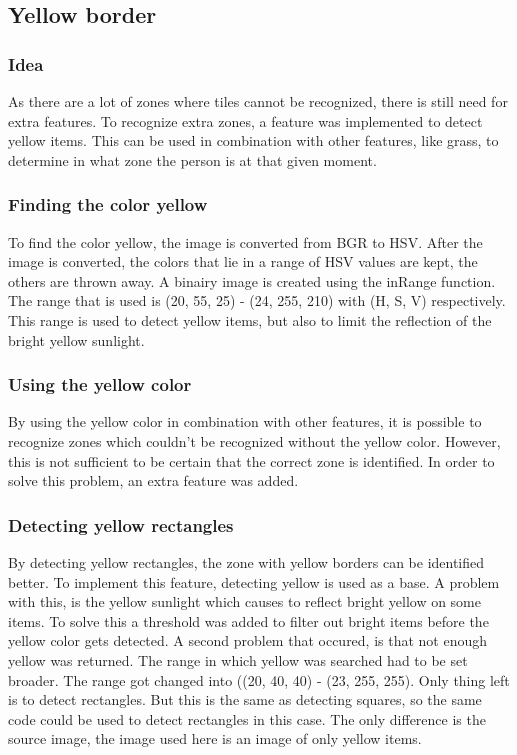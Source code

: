 \subsection{Yellow border}
\subsubsection{Idea}
As there are a lot of zones where tiles cannot be recognized, there is still need for extra features. To recognize extra zones, a feature was implemented to detect yellow items. This can be used in combination with other features, like grass, to determine in what zone the person is at that given moment. 

\subsubsection{Finding the color yellow}

To find the color yellow, the image is converted from BGR to HSV. After the image is converted, the colors that lie in a range of HSV values are kept, the others are thrown away. A binairy image is created using the inRange function. The range that is used is (20, 55, 25) - (24, 255, 210) with (H, S, V) respectively. This range is used to detect yellow items, but also to limit the reflection of the bright yellow sunlight. 

\subsubsection{Using the yellow color}
By using the yellow color in combination with other features, it is possible to recognize zones which couldn't be recognized without the yellow color. However, this is not sufficient to be certain that the correct zone is identified. In order to solve this problem, an extra feature was added.

\subsubsection{Detecting yellow rectangles}
By detecting yellow rectangles, the zone with yellow borders can be identified better. To implement this feature, detecting yellow is used as a base. A problem with this, is the yellow sunlight which causes to reflect bright yellow on some items. To solve this a threshold was added to filter out bright items before the yellow color gets detected. A second problem that occured, is that not enough yellow was returned. The range in which yellow was searched had to be set broader. The range got changed into ((20, 40, 40) - (23, 255, 255). Only thing left is to detect rectangles. But this is the same as detecting squares, so the same code could be used to detect rectangles in this case. The only difference is the source image, the image used here is an image of only yellow items. 